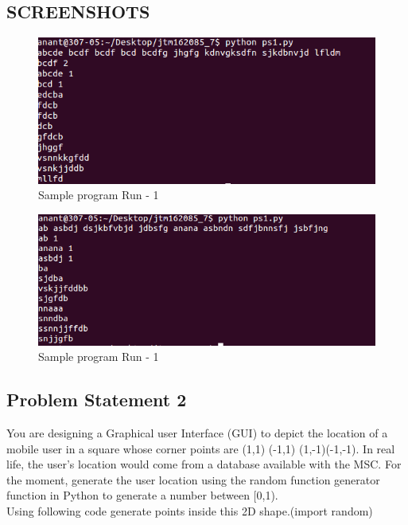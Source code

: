 \documentclass[11pt]{article}
\begin{document}
\newpage
\begin{center}
\section{SCREENSHOTS}
\bigskip
\begin{figure}[h]
\includegraphics[scale=0.7]{p11}
\centering
\caption{Sample program Run - 1}
\end{figure}
\bigskip
\begin{figure}[h]
\includegraphics[scale=0.7]{p12}
\centering
\caption{Sample program Run - 1}
\end{figure}
\end{center}
\newpage
\begin{center}
\section{Problem Statement­ 2}
\end{center}
\bigskip
You are designing a Graphical user Interface (GUI) to depict the location of a mobile user in a square whose corner points are (1,1) (-1,1) (1,-1)(-1,-1). In real life, the user’s location would come from a database available with the MSC. For the moment, generate the user location using the random function generator function in Python to generate a number between [0,1). \\

Using following code generate points inside this 2D shape.(import random)\\
\end{document}
